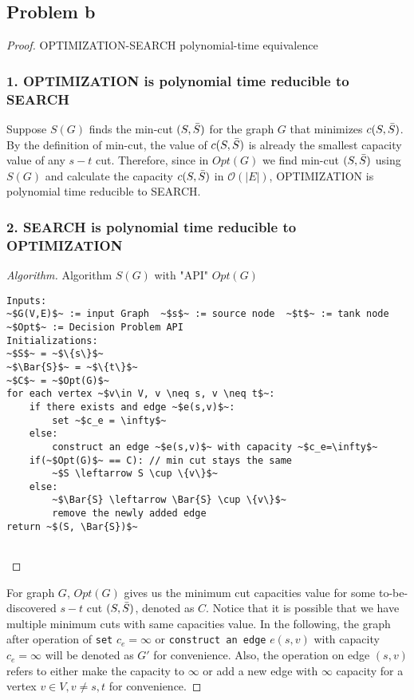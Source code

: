 \documentclass[openany]{article}
\begin{document}
\subsection*{Problem b}
\begin{proof}{}{OPTIMIZATION-SEARCH polynomial-time equivalence}
    
\subsubsection*{1. OPTIMIZATION is polynomial time reducible to SEARCH}
Suppose $S(G)$ finds the min-cut $(S,\Bar{S})$ for the graph $G$ that minimizes $c(S,\Bar{S})$. By the definition of min-cut, the value of $c(S,\Bar{S})$ is already the smallest capacity value of any $s-t$ cut. Therefore, since in $Opt(G)$ we find min-cut $(S,\Bar{S})$ using $S(G)$ and calculate the capacity $c(S,\Bar{S})$ in $\mathcal{O}(|E|)$,  OPTIMIZATION is polynomial time reducible to SEARCH.

\subsubsection*{2. SEARCH is polynomial time reducible to OPTIMIZATION} 
\begin{proof}[Algorithm]{}
		\renewcommand{\qedsymbol}{}
		Algorithm $S(G)$ with "API" $Opt(G)$
		\begin{lstlisting}[basicstyle=\fontsize{8}{9}\selectfont\ttfamily]
Inputs:
~$G(V,E)$~ := input Graph  ~$s$~ := source node  ~$t$~ := tank node
~$Opt$~ := Decision Problem API
Initializations:
~$S$~ = ~$\{s\}$~
~$\Bar{S}$~ = ~$\{t\}$~
~$C$~ = ~$Opt(G)$~
for each vertex ~$v\in V, v \neq s, v \neq t$~:
    if there exists and edge ~$e(s,v)$~:
        set ~$c_e = \infty$~
    else:
        construct an edge ~$e(s,v)$~ with capacity ~$c_e=\infty$~
    if(~$Opt(G)$~ == C): // min cut stays the same
        ~$S \leftarrow S \cup \{v\}$~
    else:
        ~$\Bar{S} \leftarrow \Bar{S} \cup \{v\}$~
        remove the newly added edge
return ~$(S, \Bar{S})$~
    
		\end{lstlisting} 
\end{proof}
For graph $G$, $Opt(G)$ gives us the minimum cut capacities value for some to-be-discovered $s-t$ cut $(S, \Bar{S})$, denoted as $C$. Notice that it is possible that we have multiple minimum cuts with same capacities value. In the following, the graph after operation of \texttt{set} $c_e = \infty$ or \texttt{construct an edge} $e(s,v)$ with capacity $c_e = \infty$ will be denoted as $G'$ for convenience. Also, the operation on edge $(s,v)$ refers to either make the capacity to $\infty$ or add a new edge with $\infty$ capacity for a vertex $v\in V, v\neq s, t$ for convenience.


\end{proof}
\end{document}
